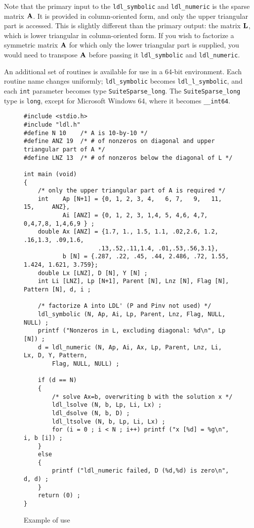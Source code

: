 \documentclass[12pt]{article}
\newcommand{\m}[1]{{\bf{#1}}}       %
\begin{document}
Note that the primary input to the {\tt ldl\_symbolic} and
{\tt ldl\_numeric} is the sparse matrix $\m{A}$.  It is provided in
column-oriented form, and only the upper triangular part is accessed.
This is slightly different than the primary output: the matrix $\m{L}$, 
which is lower triangular in column-oriented form.
If you wish to factorize a symmetric matrix $\m{A}$ for which only the lower
triangular part is supplied, you would need to transpose $\m{A}$ before
passing it {\tt ldl\_symbolic} and {\tt ldl\_numeric}.

An additional set of routines is available for use in a 64-bit environment.
Each routine name changes uniformly; {\tt ldl\_symbolic} becomes
{\tt ldl\_l\_symbolic}, and each {\tt int} parameter becomes type
{\tt SuiteSparse\_long}.  The {\tt SuiteSparse\_long} type is {\tt long}, except for
Microsoft Windows 64, where it becomes {\tt \_\_int64}.

\begin{figure}
\caption{Example of use}
\label{ldlsimple}
{\scriptsize
\begin{verbatim}
#include <stdio.h>
#include "ldl.h"
#define N 10    /* A is 10-by-10 */
#define ANZ 19  /* # of nonzeros on diagonal and upper triangular part of A */
#define LNZ 13  /* # of nonzeros below the diagonal of L */

int main (void)
{
    /* only the upper triangular part of A is required */
    int    Ap [N+1] = {0, 1, 2, 3, 4,   6, 7,   9,   11,      15,     ANZ},
           Ai [ANZ] = {0, 1, 2, 3, 1,4, 5, 4,6, 4,7, 0,4,7,8, 1,4,6,9 } ;
    double Ax [ANZ] = {1.7, 1., 1.5, 1.1, .02,2.6, 1.2, .16,1.3, .09,1.6,
                     .13,.52,.11,1.4, .01,.53,.56,3.1},
           b [N] = {.287, .22, .45, .44, 2.486, .72, 1.55, 1.424, 1.621, 3.759};
    double Lx [LNZ], D [N], Y [N] ;
    int Li [LNZ], Lp [N+1], Parent [N], Lnz [N], Flag [N], Pattern [N], d, i ;

    /* factorize A into LDL' (P and Pinv not used) */
    ldl_symbolic (N, Ap, Ai, Lp, Parent, Lnz, Flag, NULL, NULL) ;
    printf ("Nonzeros in L, excluding diagonal: %d\n", Lp [N]) ;
    d = ldl_numeric (N, Ap, Ai, Ax, Lp, Parent, Lnz, Li, Lx, D, Y, Pattern,
        Flag, NULL, NULL) ;

    if (d == N)
    {
        /* solve Ax=b, overwriting b with the solution x */
        ldl_lsolve (N, b, Lp, Li, Lx) ;
        ldl_dsolve (N, b, D) ;
        ldl_ltsolve (N, b, Lp, Li, Lx) ;
        for (i = 0 ; i < N ; i++) printf ("x [%d] = %g\n", i, b [i]) ;
    }
    else
    {
        printf ("ldl_numeric failed, D (%d,%d) is zero\n", d, d) ;
    }
    return (0) ;
}
\end{verbatim}
}
\end{figure}
\end{document}
